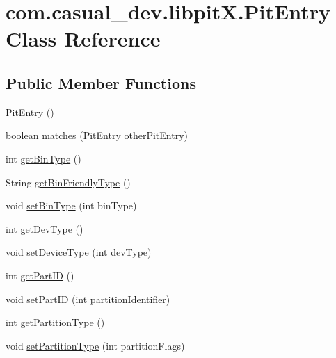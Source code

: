 \hypertarget{classcom_1_1casual__dev_1_1libpit_x_1_1_pit_entry}{\section{com.\-casual\-\_\-dev.\-libpit\-X.\-Pit\-Entry Class Reference}
\label{classcom_1_1casual__dev_1_1libpit_x_1_1_pit_entry}
}
\subsection*{Public Member Functions}
\begin{DoxyCompactItemize}
\item 
\hyperlink{classcom_1_1casual__dev_1_1libpit_x_1_1_pit_entry_a25456f5b2f43f08b9f461bd5623cbae7}{Pit\-Entry} ()
\item 
boolean \hyperlink{classcom_1_1casual__dev_1_1libpit_x_1_1_pit_entry_a87f92a1670bbeae0b5519b6db6260e9c}{matches} (\hyperlink{classcom_1_1casual__dev_1_1libpit_x_1_1_pit_entry}{Pit\-Entry} other\-Pit\-Entry)
\item 
int \hyperlink{classcom_1_1casual__dev_1_1libpit_x_1_1_pit_entry_ac26349dab56ffe55905fbe30119a5c94}{get\-Bin\-Type} ()
\item 
String \hyperlink{classcom_1_1casual__dev_1_1libpit_x_1_1_pit_entry_a0c0831d51cf860c384dd27bf443e3bc4}{get\-Bin\-Friendly\-Type} ()
\item 
void \hyperlink{classcom_1_1casual__dev_1_1libpit_x_1_1_pit_entry_a12c350ee45c1e045a8f6b79d4eb66079}{set\-Bin\-Type} (int bin\-Type)
\item 
int \hyperlink{classcom_1_1casual__dev_1_1libpit_x_1_1_pit_entry_adc7d44583bb9dc69507bcc6c3863a3e0}{get\-Dev\-Type} ()
\item 
void \hyperlink{classcom_1_1casual__dev_1_1libpit_x_1_1_pit_entry_aafa6f536d4269ff2dc9e8c665fbc3f1d}{set\-Device\-Type} (int dev\-Type)
\item 
int \hyperlink{classcom_1_1casual__dev_1_1libpit_x_1_1_pit_entry_ab2890a70a53004e54c8f26b65592e08a}{get\-Part\-I\-D} ()
\item 
void \hyperlink{classcom_1_1casual__dev_1_1libpit_x_1_1_pit_entry_ad668b5a31a41b3258a36a7372be09c26}{set\-Part\-I\-D} (int partition\-Identifier)
\item 
int \hyperlink{classcom_1_1casual__dev_1_1libpit_x_1_1_pit_entry_a54f65699bb91b46630472376707d6b18}{get\-Partition\-Type} ()
\item 
void \hyperlink{classcom_1_1casual__dev_1_1libpit_x_1_1_pit_entry_a51c79849ed9e8603fdfa10e8f8574a5f}{set\-Partition\-Type} (int partition\-Flags)

\end{DoxyCompactItemize}
